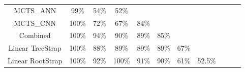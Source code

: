 \documentclass[a4paper,12pt,table]{article}
\begin{document}
\begin{table}[H]
{\begin{tabular}{|c|cccccccccc}
    MCTS\_ANN      & \multicolumn{1}{c|}{99\%}                       & \multicolumn{1}{c|}{54\%}                       & \multicolumn{1}{c|}{52\%}                       & \cellcolor[HTML]{000000}{\color[HTML]{000000} } & \cellcolor[HTML]{000000}{\color[HTML]{000000} } & \cellcolor[HTML]{000000}{\color[HTML]{000000} } & \cellcolor[HTML]{000000}{\color[HTML]{000000} } & \cellcolor[HTML]{000000}{\color[HTML]{000000} } & \cellcolor[HTML]{000000}{\color[HTML]{000000} } & \cellcolor[HTML]{000000}{\color[HTML]{000000} } \\ \cline{1-5}
    MCTS\_CNN      & \multicolumn{1}{c|}{100\%}                      & \multicolumn{1}{c|}{72\%}                       & \multicolumn{1}{c|}{67\%}                       & \multicolumn{1}{c|}{84\%}                       & \cellcolor[HTML]{000000}                        & \cellcolor[HTML]{000000}                        & \cellcolor[HTML]{000000}                        & \cellcolor[HTML]{000000}                        & \cellcolor[HTML]{000000}                        & \cellcolor[HTML]{000000}                        \\ \cline{1-6}
    Combined        & \multicolumn{1}{c|}{100\%}                     & \multicolumn{1}{c|}{94\%}                       & \multicolumn{1}{c|}{90\%}                       & \multicolumn{1}{c|}{89\%}                       & \multicolumn{1}{c|}{85\%}                       & \cellcolor[HTML]{000000}                     & \cellcolor[HTML]{000000}                       & \cellcolor[HTML]{000000}                        & \cellcolor[HTML]{000000}                        & \cellcolor[HTML]{000000}                        \\ \cline{1-7}
    Linear TreeStrap & \multicolumn{1}{c|}{100\%}                    & \multicolumn{1}{c|}{88\%}                       & \multicolumn{1}{c|}{89\%}                       & \multicolumn{1}{c|}{89\%}                       & \multicolumn{1}{c|}{89\%}                       & \multicolumn{1}{c|}{67\%}                           & \cellcolor[HTML]{000000}                        & \cellcolor[HTML]{000000}                        & \cellcolor[HTML]{000000}                        & \cellcolor[HTML]{000000}                        \\ \cline{1-8}
    Linear RootStrap & \multicolumn{1}{c|}{100\%}                    & \multicolumn{1}{c|}{92\%}                       & \multicolumn{1}{c|}{100\%}                      & \multicolumn{1}{c|}{91\%}                       & \multicolumn{1}{c|}{90\%}                       & \multicolumn{1}{c|}{61\%}                           & \multicolumn{1}{c|}{52.5\%}                           & \cellcolor[HTML]{000000}                        & \cellcolor[HTML]{000000}                        & \cellcolor[HTML]{000000}                        \\ \cline{1-9}

\end{tabular}}
\end{table}
\end{document}
